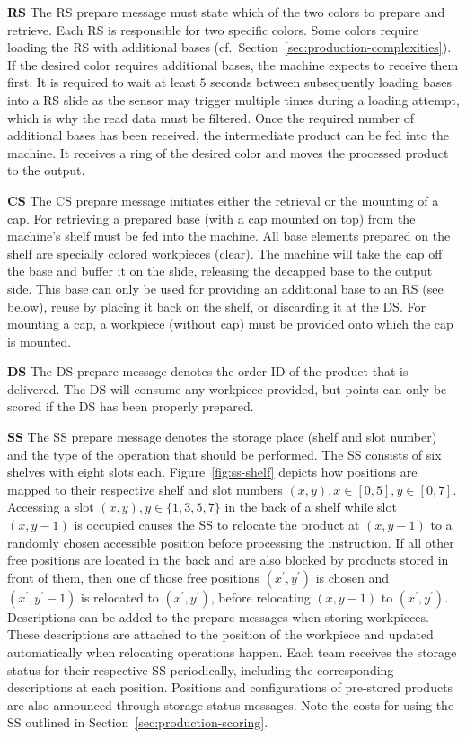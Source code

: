 \documentclass[12pt,twoside]{article}
\newcommand{\refsec}[1]{Section~\ref{#1}}
\newcommand{\reffig}[1]{Figure~\ref{#1}}
\begin{document}
\noindent\textbf{\acl{RS}}
The \ac{RS} prepare message must state which of the two colors to prepare and
retrieve. Each \ac{RS} is responsible for two specific colors. Some colors
require loading the \ac{RS} with additional bases
(cf.~\refsec{sec:production-complexities}). If the desired color requires
additional bases, the machine expects to receive them first.
It is required to wait at least $5$ seconds between
subsequently loading bases into a \ac{RS} slide as the sensor may trigger
multiple times during a loading attempt, which is why the read data must be
filtered.
Once the required number of
additional bases has been received, the intermediate product can be
fed into the machine. It receives a ring of the desired color and
moves the processed product to the output.

\noindent\textbf{\acl{CS}}
The \ac{CS} prepare message initiates either the retrieval or the mounting of
a cap. For retrieving a prepared base (with a cap mounted on top) from
the machine's shelf must be fed into the machine. All base elements
prepared on the shelf are specially colored workpieces (clear). The
machine will take the cap off the base and buffer it on the slide,
releasing the decapped base to the output side. This base can only be
used for providing an additional base to an \ac{RS} (see below), reuse by
placing it back on the shelf, or discarding it at the \ac{DS}.  For
mounting a cap, a workpiece (without cap) must be provided onto which
the cap is mounted.

\noindent\textbf{\acl{DS}}
The \ac{DS} prepare message denotes the order ID of the product
that is delivered.
The \ac{DS} will consume any workpiece provided,
but points can only be scored if the \ac{DS} has been properly prepared.

\noindent\textbf{\acl{SS}}
The \ac{SS} prepare message denotes the storage place (shelf and slot number)
and the type of the operation that should be performed.
The \ac{SS} consists of six shelves with eight slots each. \reffig{fig:ss-shelf}
depicts how positions are mapped to their respective shelf and slot numbers
$(x,y),x\in[0,5],y\in[0,7]$.
Accessing a slot $(x,y), y\in\{1,3,5,7\}$ in the back of a shelf while slot
$(x,y-1)$ is occupied causes the \ac{SS} to relocate the product at $(x,y-1)$
to a randomly chosen accessible position before processing the instruction.
If all other free positions are located in the back and
are also blocked by products stored in front of them, then one of those free
positions $(x^\prime,y^\prime)$ is chosen and
$(x^\prime,y^\prime-1)$ is relocated to $(x^\prime,y^\prime)$, before
relocating $(x,y-1)$ to $(x^\prime,y^\prime)$.
Descriptions can be added to the prepare messages when storing workpieces.
These descriptions are attached to the position of the workpiece and updated
automatically when relocating operations happen.
Each team receives the storage status for their respective \ac{SS}
periodically, including the corresponding descriptions at each position.
Positions and configurations of pre-stored products are also announced through
storage status messages.
Note the costs for using the \ac{SS} outlined in
\refsec{sec:production-scoring}.
\end{document}
